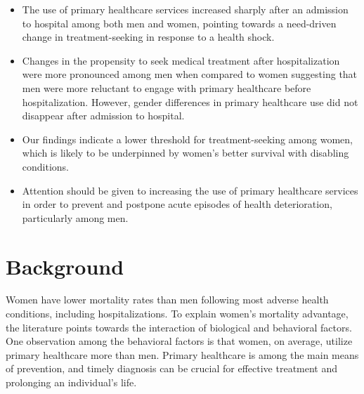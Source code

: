 \begin{itemize}
	\item	The use of primary healthcare services increased sharply after an 
			admission to hospital among both men and women, pointing towards 
			a need-driven change in treatment-seeking in response to a health 
			shock.
	\item	Changes in the propensity to seek medical treatment after hospitalization 
			were more pronounced among men when compared to women suggesting that men 
			were more reluctant to engage with primary healthcare before hospitalization. 
			However, gender differences in primary healthcare use did not disappear 
			after admission to hospital.
	\item	Our findings indicate a lower threshold for treatment-seeking among women, 
			which is likely to be underpinned by women's better survival with disabling 
			conditions.
	\item	Attention should be given to increasing the use of primary healthcare 
			services in order to prevent and postpone acute episodes of health deterioration, 
			particularly among men.
\end{itemize}




\newpage

\section{Background}

Women have lower mortality rates than men following most adverse health 
conditions, including hospitalizations.\citep{wang2016global,zarulli2018women,
hohn2018sex} To explain women's mortality advantage, the literature points 
towards the interaction of biological and behavioral factors.\citep{oksuzyan2008,
rieker2005rethinking} One observation among the behavioral factors is that 
women, on average, utilize primary healthcare more than men.\citep{banks2013men,
juel2008men} Primary healthcare is among the main means of prevention, and 
timely diagnosis can be crucial for effective treatment and prolonging an 
individual's life.\citep{olesen2009delay,starfield2005contribution}

